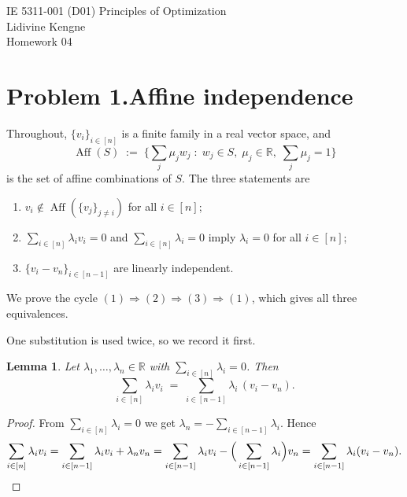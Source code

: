 \documentclass[11pt]{article}
\DeclareMathOperator{\Aff}{Aff}
\theoremstyle{definition}
\theoremstyle{plain}
\newtheorem{lemma}{Lemma}
\begin{document}
\begin{center}
  {\large IE 5311-001 (D01) Principles of Optimization}\\[4pt]
  Lidivine Kengne\\[2pt]
  Homework 04
\end{center}
\vspace{0.6em}

\section*{Problem 1.\quad Affine independence \quad[15 pts]}

Throughout, $\{v_i\}_{i \in [n]}$ is a finite family in a real vector
space, and
\[
  \Aff(S) \;:=\;
  \Big\{ \textstyle\sum_{j} \mu_j w_j \;:\;
    w_j \in S,\; \mu_j \in \mathbb{R},\;
    \textstyle\sum_j \mu_j = 1 \Big\}
\]
is the set of affine combinations of $S$. The three statements are

\begin{enumerate}
  \item[(1)] $v_i \notin \Aff(\{v_j\}_{j \ne i})$ for all $i \in [n]$;
  \item[(2)] $\sum_{i \in [n]} \lambda_i v_i = 0$ and
        $\sum_{i \in [n]} \lambda_i = 0$ imply $\lambda_i = 0$ for all
        $i \in [n]$;
  \item[(3)] $\{v_i - v_n\}_{i \in [n-1]}$ are linearly independent.
\end{enumerate}

We prove the cycle $(1) \Rightarrow (2) \Rightarrow (3) \Rightarrow (1)$,
which gives all three equivalences.

One substitution is used twice, so we record it first.

\begin{lemma}\label{lem:sub}
Let $\lambda_1,\dots,\lambda_n \in \mathbb{R}$ with
$\sum_{i \in [n]} \lambda_i = 0$. Then
\[
  \sum_{i \in [n]} \lambda_i v_i
  \;=\; \sum_{i \in [n-1]} \lambda_i\,(v_i - v_n).
\]
\end{lemma}

\begin{proof}
From $\sum_{i \in [n]} \lambda_i = 0$ we get
$\lambda_n = -\sum_{i \in [n-1]} \lambda_i$. Hence
\[
  \sum_{i \in [n]} \lambda_i v_i
  = \sum_{i \in [n-1]} \lambda_i v_i + \lambda_n v_n
  = \sum_{i \in [n-1]} \lambda_i v_i
    - \Big( \sum_{i \in [n-1]} \lambda_i \Big) v_n
  = \sum_{i \in [n-1]} \lambda_i (v_i - v_n). \qedhere
\]
\end{proof}
\end{document}
